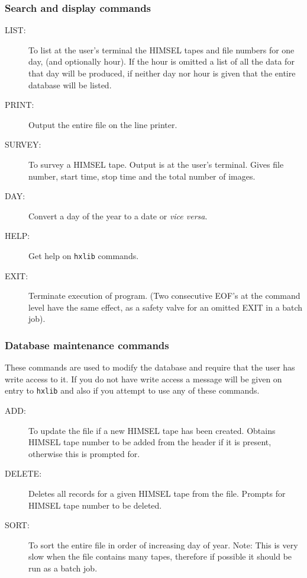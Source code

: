 \subsubsection{Search and display commands}

\begin{description}
\item[LIST: ]    To list at the user's terminal the HIMSEL tapes and file
numbers for one day, (and optionally hour). If the hour is omitted a
list of all the data for that day will be produced, if neither day nor
hour is given that the entire database will be listed.

\item[PRINT: ]    Output the entire file on the line printer.

\item[SURVEY: ]   To survey a HIMSEL tape. Output is at the user's terminal.
Gives file number, start time, stop time and the total number of
images.

\item[DAY: ] Convert a day of the year to a date or {\em vice versa}.

\item[HELP: ] Get help on \verb!hxlib! commands.

\item[EXIT: ]     Terminate execution of program. (Two consecutive EOF's at
the command level have the same effect, as a safety valve for an
omitted EXIT in a batch job).
\end{description}

\subsubsection{Database maintenance commands}

These commands are used to modify the database and require that the
user has write access to it.  If you do not have write access a message
will be given on entry to \verb!hxlib! and also if you attempt to use
any of these commands.

\begin{description}
\item[ADD: ]  To update the file if a new HIMSEL tape has been created.
Obtains HIMSEL tape number to be added from the header if it is
present, otherwise this is prompted for.

\item[DELETE: ] Deletes all records for a given HIMSEL tape from the file.
Prompts for HIMSEL tape number to be deleted.

\item[SORT: ]  To sort the entire file in order of increasing day of
year. Note: This is very slow when the file contains many tapes,
therefore if possible it should be run as a batch job.
\end{description}

